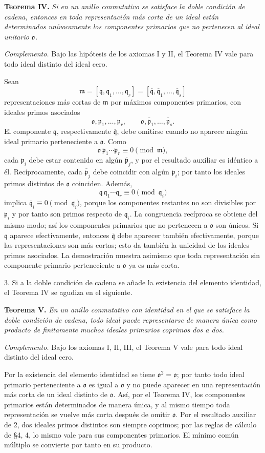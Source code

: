 \documentclass[11pt]{article}
\providecommand{\mbar}[1]{\overline{#1}}
\providecommand{\mm}{\mathfrak{m}}
\providecommand{\mo}{\mathfrak{o}}
\providecommand{\mpideal}{\mathfrak{p}}
\providecommand{\mq}{\mathfrak{q}}
\begin{document}
\textbf{Teorema IV.} \emph{Si en un anillo conmutativo se satisface la doble condición de cadena, entonces en toda representación más corta de un ideal están determinados unívocamente los componentes primarios que no pertenecen al ideal unitario $\mo$.}

\emph{Complemento.} Bajo las hipótesis de los axiomas I y II, el Teorema IV vale para todo ideal distinto del ideal cero.

Sean
\[
        \mm=[\mq,\mq_1,\ldots,\mq_r]=[\mbar\mq,\mbar\mq_1,\ldots,\mbar\mq_s]
\]
representaciones más cortas de $\mm$ por máximos componentes primarios, con ideales primos asociados
\[
        \mo,\mpideal_1,\ldots,\mpideal_r,
        \qquad \mo,\mbar\mpideal_1,\ldots,\mbar\mpideal_s.
\]
El componente $\mq$, respectivamente $\mbar\mq$, debe omitirse cuando no aparece ningún ideal primario perteneciente a $\mo$. Como
\[
        \mo\,\mpideal_1\cdots\mpideal_r\equiv0\pmod{\mm},
\]
cada $\mpideal_i$ debe estar contenido en algún $\mbar\mpideal_j$, y por el resultado auxiliar es idéntico a él. Recíprocamente, cada $\mbar\mpideal_j$ debe coincidir con algún $\mpideal_i$; por tanto los ideales primos distintos de $\mo$ coinciden. Además,
\[
        \mq\,\mq_1\cdots\mq_r\equiv0\pmod{\mq_i}
\]
implica $\mbar\mq_i\equiv0\pmod{\mq_i}$, porque los componentes restantes no son divisibles por $\mpideal_i$ y por tanto son primos respecto de $\mq_i$. La congruencia recíproca se obtiene del mismo modo; así los componentes primarios que no pertenecen a $\mo$ son únicos. Si $\mq$ aparece efectivamente, entonces $\mbar\mq$ debe aparecer también efectivamente, porque las representaciones son más cortas; esto da también la unicidad de los ideales primos asociados. La demostración muestra asimismo que toda representación sin componente primario perteneciente a $\mo$ ya es más corta.

3. Si a la doble condición de cadena se añade la existencia del elemento identidad, el Teorema IV se agudiza en el siguiente.

\textbf{Teorema V.} \emph{En un anillo conmutativo con identidad en el que se satisface la doble condición de cadena, todo ideal puede representarse de manera única como producto de finitamente muchos ideales primarios coprimos dos a dos.}

\emph{Complemento.} Bajo los axiomas I, II, III, el Teorema V vale para todo ideal distinto del ideal cero.

Por la existencia del elemento identidad se tiene $\mo^2=\mo$; por tanto todo ideal primario perteneciente a $\mo$ es igual a $\mo$ y no puede aparecer en una representación más corta de un ideal distinto de $\mo$. Así, por el Teorema IV, los componentes primarios están determinados de manera única, y al mismo tiempo toda representación se vuelve más corta después de omitir $\mo$. Por el resultado auxiliar de 2, dos ideales primos distintos son siempre coprimos; por las reglas de cálculo de §4, 4, lo mismo vale para sus componentes primarios. El mínimo común múltiplo se convierte por tanto en su producto.
\end{document}

